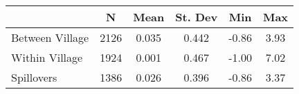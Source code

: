 \begin{tabular}{l*{5}{c}}\hline&\multicolumn{1}{c}{N}&\multicolumn{1}{c}{Mean}&\multicolumn{1}{c}{St. Dev}&\multicolumn{1}{c}{Min}&\multicolumn{1}{c}{Max}\\ \hline 
Between Village & 2126 & 0.035 & 0.442 & -0.86 & 3.93 \\
Within Village & 1924 & 0.001 & 0.467 & -1.00 & 7.02 \\
Spillovers & 1386 & 0.026 & 0.396 & -0.86 & 3.37 \\
\hline \end{tabular}

